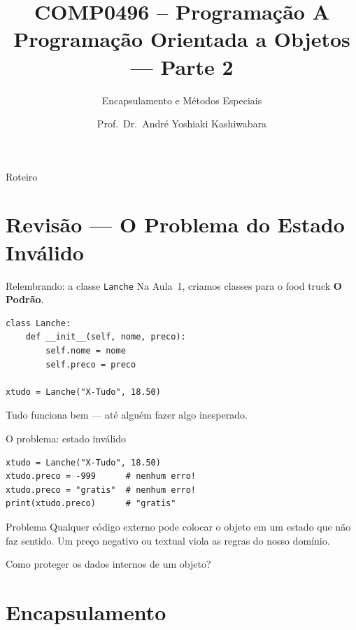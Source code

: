 \documentclass[aspectratio=169]{beamer}
\title{COMP0496 -- Programação A \\ Programação Orientada a Objetos --- Parte 2}
\subtitle{Encapsulamento e Métodos Especiais}
\author{Prof.\ Dr.\ André Yoshiaki Kashiwabara}
\institute{DCOMP -- Universidade Federal de Sergipe\\\texttt{andreyoshiaki@dcomp.ufs.br}}
\date{}
\begin{document}
\begin{frame}
\titlepage
\end{frame}

\begin{frame}{Roteiro}
\tableofcontents
\end{frame}

\section{Revisão --- O Problema do Estado Inválido}

\begin{frame}[fragile]{Relembrando: a classe \texttt{Lanche}}
Na Aula~1, criamos classes para o food truck \textbf{O Podrão}.

\begin{lstlisting}
class Lanche:
    def __init__(self, nome, preco):
        self.nome = nome
        self.preco = preco

xtudo = Lanche("X-Tudo", 18.50)
\end{lstlisting}

Tudo funciona bem --- até alguém fazer algo inesperado.
\end{frame}

\begin{frame}[fragile]{O problema: estado inválido}
\begin{lstlisting}
xtudo = Lanche("X-Tudo", 18.50)
xtudo.preco = -999      # nenhum erro!
xtudo.preco = "gratis"  # nenhum erro!
print(xtudo.preco)      # "gratis"
\end{lstlisting}

\begin{alertblock}{Problema}
Qualquer código externo pode colocar o objeto em um estado que não faz sentido.
Um preço negativo ou textual viola as regras do nosso domínio.
\end{alertblock}

\medskip
Como proteger os dados internos de um objeto?
\end{frame}

\section{Encapsulamento}
\end{document}
